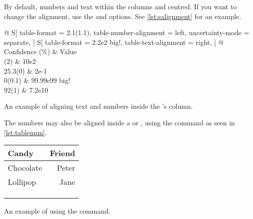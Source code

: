 By default, numbers and text within the  columns and centred. If you
want to change the alignment, use the  and
 options. See \autoref{lst:salignment} for an
example.
\begin{listing}
  \begin{example}[examplewidth=0.7\linewidth, vertical_mode]
\begin{tabular} {
    @{}
    S[
      table-format = 2.1(1.1),
      table-number-alignment = left,
      uncertainty-mode = separate,
    ]
    S[
      table-format = 2.2e2{ big!},
      table-text-alignment = right,
    ]
    @{}
  }
  \toprule
  {Confidence (\unit{\percent})}
    & {Value} \\
  (2) & 10e2 \\
  25.3(0) & 2e-1 \\
  0(0.1)  & 99.99e99{ big!} \\
  92(1)      & 7.2e10 \\
  \bottomrule
\end{tabular}
\end{example}
  \caption{An example of aligning text and numbers inside the 's
     column.}\label{lst:salignment}
\end{listing}
The numbers may also be aligned inside a  or ,
using the  command as seen in \autoref{lst:tablenum}.
\begin{listing}
  \begin{example}[examplewidth=0.75\linewidth, vertical_mode]
\begin{tabular}{@{}lr@{}}
  \toprule
  Candy     & Friend                         \\
  \midrule
  Chocolate & Peter                          \\
  Lollipop  & Jane                           \\
  \multicolumn{2}{c}{\tablenum{12,34 e0}}    \\
  \multicolumn{2}{c}{\tablenum{333.5567 e1}} \\
  \multicolumn{2}{c}{\tablenum{4563.21 e2}}  \\
  \bottomrule
\end{tabular}
\end{example}
  \caption{An example of using the  command.}\label{lst:tablenum}
\end{listing}

